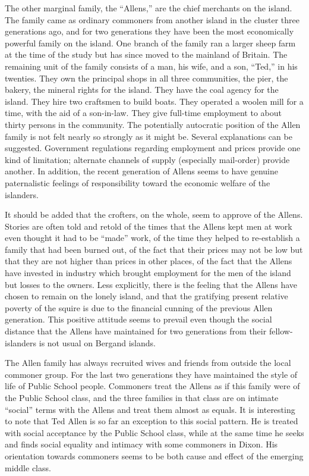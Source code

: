 \documentclass[twoside,symmetric,nobib,justified]{tufte-book}
\begin{document}
The other marginal family, the ``Allens,'' are the chief merchants on
the island. The family came as ordinary commoners from another island in
the cluster three generations ago, and for two generations they have
been the most economically powerful family on the island. One branch of
the family ran a larger sheep farm at the time of the study but has
since moved to the mainland of Britain. The remaining unit of the family
consists of a man, his wife, and a son, ``Ted,'' in his twenties. They
own the principal shops in all three communities, the pier, the bakery,
the mineral rights for the island. They have the coal agency for the
island. They hire two craftsmen to build boats. They operated a woolen
mill for a time, with the aid of a son-in-law. They give full-time
employment to about thirty persons in the community. The potentially
autocratic position of the Allen family is not felt nearly so strongly
as it might be. Several explanations can be suggested. Government
regulations regarding employment and prices provide one kind of
limitation; alternate channels of supply (especially mail-order) provide
another. In addition, the recent generation of Allens seems to have
genuine paternalistic feelings of responsibility toward the economic
welfare of the islanders.

It should be added that the crofters, on the whole, seem to approve of
the Allens. Stories are often told and retold of the times that the
Allens kept men at work even thought it had to be ``made'' work, of the
time they helped to re-establish a family that had been burned out, of
the fact that their prices may not be low but that they are not higher
than prices in other places, of the fact that the Allens have invested
in industry which brought employment for the men of the island but
losses to the owners. Less explicitly, there is the feeling that the
Allens have chosen to remain on the lonely island, and that the
gratifying present relative poverty of the squire is due to the
financial cunning of the previous Allen generation. This positive
attitude seems to prevail even though the social distance that the
Allens have maintained for two generations from their fellow-islanders
is not usual on Bergand islands.

The Allen family has always recruited wives and friends from outside the
local commoner group. For the last two generations they have maintained
the style of life of Public School people. Commoners treat the Allens as
if this family were of the Public School class, and the three families
in that class are on intimate ``social'' terms with the Allens and treat
them almost as equals. It is interesting to note that Ted Allen is so
far an exception to this social pattern. He is treated with social
acceptance by the Public School class, while at the same time he seeks
and finds social equality and intimacy with some commoners in Dixon. His
orientation towards commoners seems to be both cause and effect of the
emerging middle class.
\end{document}
